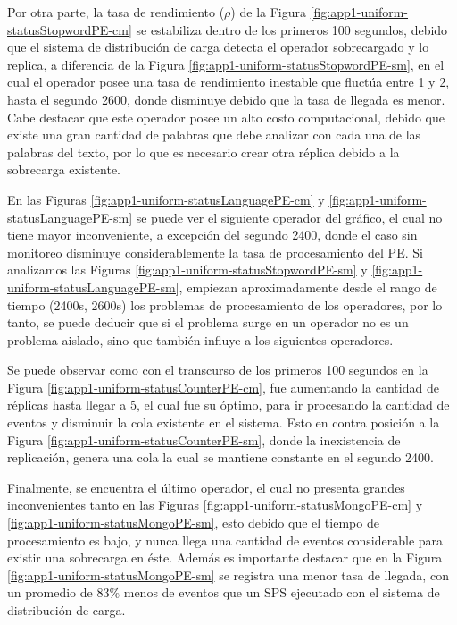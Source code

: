 Por otra parte, la tasa de rendimiento ($\rho$) de la Figura \ref{fig:app1-uniform-statusStopwordPE-cm} se estabiliza dentro de los primeros 100 segundos, debido que el sistema de distribución de carga detecta el operador sobrecargado y lo replica, a diferencia de la Figura \ref{fig:app1-uniform-statusStopwordPE-sm}, en el cual el operador posee una tasa de rendimiento inestable que fluctúa entre 1 y 2, hasta el segundo 2600, donde disminuye debido que la tasa de llegada es menor. Cabe destacar que este operador posee un alto costo computacional, debido que existe una gran cantidad de palabras que debe analizar con cada una de las palabras del texto, por lo que es necesario crear otra réplica debido a la sobrecarga existente.

En las Figuras \ref{fig:app1-uniform-statusLanguagePE-cm} y \ref{fig:app1-uniform-statusLanguagePE-sm} se puede ver el siguiente operador del gráfico, el cual no tiene mayor inconveniente, a excepción del segundo 2400, donde el caso sin monitoreo disminuye considerablemente la tasa de procesamiento del PE. Si analizamos las Figuras \ref{fig:app1-uniform-statusStopwordPE-sm} y \ref{fig:app1-uniform-statusLanguagePE-sm}, empiezan aproximadamente desde el rango de tiempo (2400s, 2600s) los problemas de procesamiento de los operadores, por lo tanto, se puede deducir que si el problema surge en un operador no es un problema aislado, sino que también influye a los siguientes operadores.

Se puede observar como con el transcurso de los primeros 100 segundos en la Figura \ref{fig:app1-uniform-statusCounterPE-cm}, fue aumentando la cantidad de réplicas hasta llegar a 5, el cual fue su óptimo, para ir procesando la cantidad de eventos y disminuir la cola existente en el sistema. Esto en contra posición a la Figura \ref{fig:app1-uniform-statusCounterPE-sm}, donde la inexistencia de replicación, genera una cola la cual se mantiene constante en el segundo 2400.

Finalmente, se encuentra el último operador, el cual no presenta grandes inconvenientes tanto en las Figuras \ref{fig:app1-uniform-statusMongoPE-cm} y \ref{fig:app1-uniform-statusMongoPE-sm}, esto debido que el tiempo de procesamiento es bajo, y nunca llega una cantidad de eventos considerable para existir una sobrecarga en éste. Además es importante destacar que en la Figura \ref{fig:app1-uniform-statusMongoPE-sm} se registra una menor tasa de llegada, con un promedio de $83\%$ menos de eventos que un SPS ejecutado con el sistema de distribución de carga.

